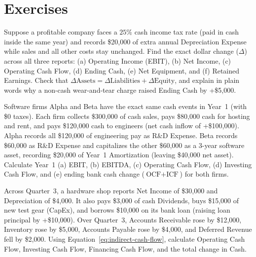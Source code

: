 \section*{Exercises}

\begin{exercise}
\label{ex:ch02-depreciation-shock}
Suppose a profitable company faces a $25\%$ cash income tax rate (paid in cash inside the same year) and records \$20,000 of extra annual Depreciation Expense while sales and all other costs stay unchanged. Find the exact dollar change ($\Delta$) across all three reports: (a) Operating Income (EBIT), (b) Net Income, (c) Operating Cash Flow, (d) Ending Cash, (e) Net Equipment, and (f) Retained Earnings. Check that $\Delta\text{Assets} = \Delta\text{Liabilities} + \Delta\text{Equity}$, and explain in plain words why a non-cash wear-and-tear charge raised Ending Cash by +\$5,000.
\end{exercise}

\begin{exercise}
\label{ex:ch02-capex-vs-opex}
Software firms Alpha and Beta have the exact same cash events in Year~1 (with \$0 taxes). Each firm collects \$300,000 of cash sales, pays \$80,000 cash for hosting and rent, and pays \$120,000 cash to engineers (net cash inflow of +\$100,000). Alpha records all \$120,000 of engineering pay as R\&D Expense. Beta records \$60,000 as R\&D Expense and capitalizes the other \$60,000 as a 3-year software asset, recording \$20,000 of Year~1 Amortization (leaving \$40,000 net asset). Calculate Year~1 (a) EBIT, (b) EBITDA, (c) Operating Cash Flow, (d) Investing Cash Flow, and (e) ending bank cash change ($\text{OCF} + \text{ICF}$) for both firms.
\end{exercise}

\begin{exercise}
\label{ex:ch02-indirect-cfs-build}
Across Quarter~3, a hardware shop reports Net Income of \$30,000 and Depreciation of \$4,000. It also pays \$3,000 of cash Dividends, buys \$15,000 of new test gear (CapEx), and borrows \$10,000 on its bank loan (raising loan principal by +\$10,000). Over Quarter~3, Accounts Receivable rose by \$12,000, Inventory rose by \$5,000, Accounts Payable rose by \$4,000, and Deferred Revenue fell by \$2,000. Using Equation~\eqref{eq:indirect-cash-flow}, calculate Operating Cash Flow, Investing Cash Flow, Financing Cash Flow, and the total change in Cash.
\end{exercise}

